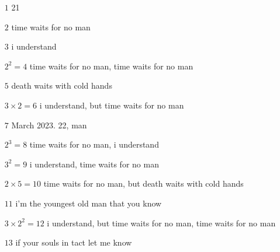\documentclass[11pt]{article}
\begin{document}
\begin{enumerate}
        \begin{itemize}
          \item[\(1\)] 21
          \item[\(2\)] time waits for no man
          \item[\(3\)] i understand
          \item[\(2^2 = 4\)] time waits for no man, time waits for no man
          \item[\(5\)] death waits with cold hands
          \item[\(3 \times 2 = 6\)] i understand, but time waits for no man
          \item[\(7\)] March 2023.  22, man
          \item[\(2^3 = 8\)] time waits for no man, i understand
          \item[\(3^2 = 9\)] i understand, time waits for no man
          \item[\(2 \times 5 = 10\)] time waits for no man, but death waits with cold hands
          \item[\(11\)] i'm the youngest old man that you know
          \item[\(3 \times 2^2 = 12\)] i understand, but time waits for no man, time waits for no man
          \item[\(13\)] if your souls in tact let me know
        \end{itemize}
  \end{enumerate}
\end{document}
